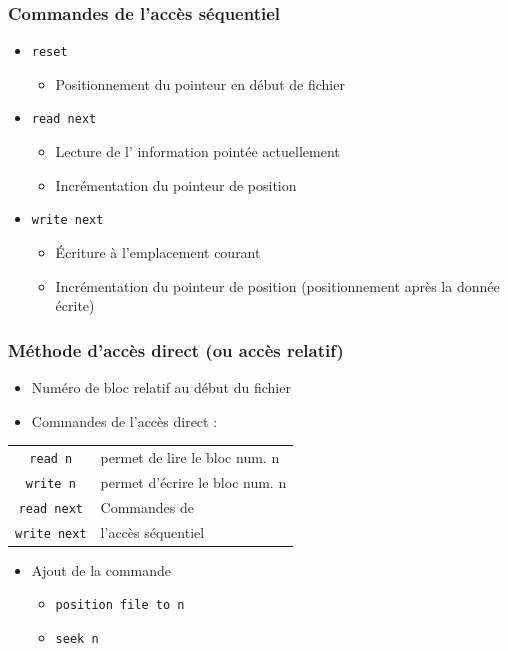 \begin{frame}
\frametitle{Commandes de l'accès séquentiel}
\begin{itemize}
\item \texttt{reset}
\begin{itemize}
\item Positionnement du pointeur en début de fichier
\end{itemize}
\item \texttt{read next}
\begin{itemize}
\item Lecture de l' information pointée actuellement
\item Incrémentation du pointeur de position
\end{itemize}
\item \texttt{write next}
\begin{itemize}
\item Écriture à l'emplacement courant
\item Incrémentation du pointeur de position (positionnement après la donnée écrite)
\end{itemize}
\end{itemize}
\end{frame}

\begin{frame}
\frametitle{Méthode d'accès direct (ou accès relatif)}
\begin{itemize}
\item Numéro de bloc relatif au début du fichier
\item Commandes de l'accès direct :
\end{itemize}
\begin{tabular}{c|l}
\texttt{read n} & permet de lire le bloc num. n \\
\texttt{write n} & permet d'écrire le bloc num. n \\
\texttt{read next}	&	Commandes de \\
\texttt{write next}	&	l'accès séquentiel \\
\end{tabular}
\begin{itemize}
\item Ajout de la commande
\begin{itemize}
\item \texttt{position file to n}
\item \texttt{seek n}
\end{itemize}

\end{itemize}
\end{frame}

